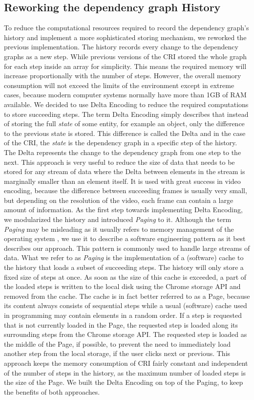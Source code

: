 \subsection{Reworking the dependency graph History}
To reduce the computational resources required to record the dependency graph's history and implement a more sophisticated storing mechanism, we reworked the previous implementation. The history records every change to the dependency graphs as a new step. While previous versions of the CRI stored the whole graph for each step inside an array for simplicity. This means the required memory will increase proportionally with the number of steps. However, the overall memory consumption will not exceed the limits of the environment except in extreme cases, because modern computer systems normally have more than 1GB of RAM available. We decided to use Delta Encoding to reduce the required computations to store succeeding steps. The term Delta Encoding simply describes that instead of storing the full \emph{state} of some entity, for example an object, only the difference to the previous state is stored. This difference is called the Delta and in the case of the CRI, the \emph{state} is the dependency graph in a specific step of the history. The Delta represents the change to the dependency graph from one step to the next. This approach is very useful to reduce the size of data that needs to be stored for any stream of data where the Delta between elements in the stream is marginally smaller than an element itself. It is used with great success in video encoding, because the difference between succeeding frames is usually very small, but depending on the resolution of the video, each frame can contain a large amount of information.
As the first step towards implementing Delta Encoding, we modularized the history and introduced \emph{Paging} to it. Although the term \emph{Paging} may be misleading as it usually refers to memory management of the operating system \cite{PagingWiki}, we use it to describe a software engineering pattern as it best describes our approach. This pattern is commonly used to handle large streams of data. What we refer to as \emph{Paging} is the implementation of a (software) cache to the history that loads a subset of succeeding steps. The history will only store a fixed size of steps at once. As soon as the size of this cache is exceeded, a part of the loaded steps is written to the local disk using the Chrome storage API and removed from the cache. The cache is in fact better referred to as a Page, because its content always consists of sequential steps while a usual (software) cache used in programming may contain elements in a random order. If a step is requested that is not currently loaded in the Page, the requested step is loaded along its surrounding steps from the Chrome storage API. The requested step is loaded as the middle of the Page, if possible, to prevent the need to immediately load another step from the local storage, if the user clicks next or previous. This approach keeps the memory consumption of CRI fairly constant and independent of the number of steps in the history, as the maximum number of loaded steps is the size of the Page. We built the Delta Encoding on top of the Paging, to keep the benefits of both approaches.
